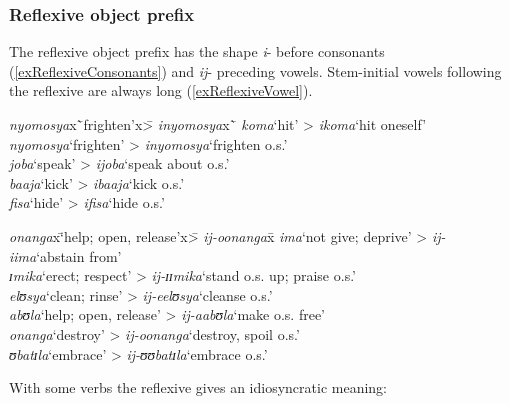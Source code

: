 \subsubsection{Reflexive object prefix}\label{Reflexive}
The reflexive object prefix has the shape \textit{i}- before consonants (\ref{exReflexiveConsonants}) and \textit{ij}- preceding vowels. Stem-initial vowels following the reflexive are always long (\ref{exReflexiveVowel}).
\begin{exe}
	\ex\label{exReflexiveConsonants}
	\begin{tabbing}
		\textit{nyomosya}x\=`frighten'x\= > \textit{inyomosya}x\=`\kill
		\textit{koma}\>\lq hit'\> > \textit{ikoma}\>`hit oneself'\\
		\textit{nyomosya}\>`frighten'\> > \textit{inyomosya}\>`frighten o.s.'\\
		\textit{joba}\>`speak'\> > \textit{ijoba}\>`speak about o.s.'\\
		\textit{baaja}\>`kick'\> > \textit{ibaaja}\>`kick o.s.'\\
		\textit{fisa}\>`hide'\> > \textit{ifisa}\>`hide o.s.'
	\end{tabbing}
	\ex\label{exReflexiveVowel}
	\begin{tabbing}
		\textit{onanga}x\=\lq help; open, release'x\= > \textit{ij-oonanga}x\=\kill
		\textit{ima}\>`not give; deprive'\> > \textit{ij-iima}\>`abstain from'\\
		\textit{ɪmika}\>\lq erect; respect'\> > \textit{ij-ɪɪmika}\>`stand o.s. up; praise o.s.'\\
		\textit{elʊsya}\>`clean; rinse'\> > \textit{ij-eelʊsya}\>`cleanse o.s.'\\
		\textit{abʊla}\>\lq help; open, release'\> > \textit{ij-aabʊla}\>`make o.s. free'\\
		\textit{onanga}\>\lq destroy'\> > \textit{ij-oonanga}\>`destroy, spoil o.s.'\\
		\textit{ʊbatɪla}\>`embrace'\> > \textit{ij-ʊʊbatɪla}\>`embrace o.s.'
	\end{tabbing}
\end{exe}

With some verbs the reflexive gives an idiosyncratic meaning:

